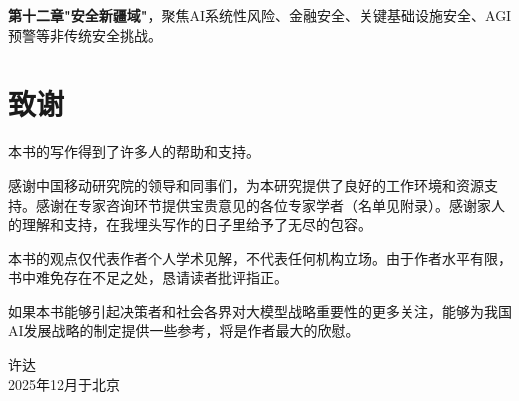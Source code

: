 \textbf{第十二章"安全新疆域"}，聚焦AI系统性风险、金融安全、关键基础设施安全、AGI预警等非传统安全挑战。

\section*{致谢}

本书的写作得到了许多人的帮助和支持。

感谢中国移动研究院的领导和同事们，为本研究提供了良好的工作环境和资源支持。感谢在专家咨询环节提供宝贵意见的各位专家学者（名单见附录）。感谢家人的理解和支持，在我埋头写作的日子里给予了无尽的包容。

本书的观点仅代表作者个人学术见解，不代表任何机构立场。由于作者水平有限，书中难免存在不足之处，恳请读者批评指正。

如果本书能够引起决策者和社会各界对大模型战略重要性的更多关注，能够为我国AI发展战略的制定提供一些参考，将是作者最大的欣慰。

\begin{flushright}
许\quad 达\\
2025年12月于北京
\end{flushright}
